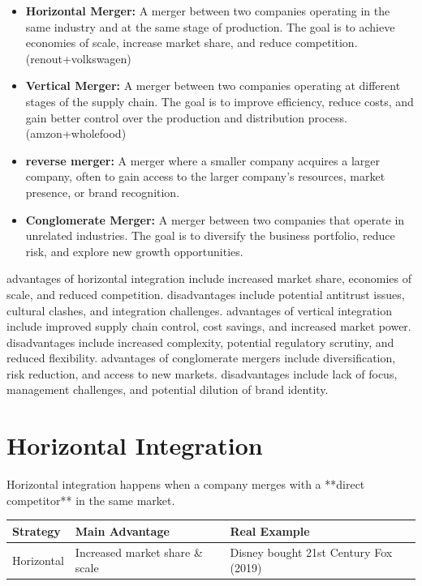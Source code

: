 \documentclass[12pt,a4paper]{report}
\begin{document}
\begin{itemize}
    \item \textbf{Horizontal Merger:} A merger between two companies operating in the same industry and at the same stage of production. The goal is to achieve economies of scale, increase market share, and reduce competition.(renout+volkswagen)
    \item \textbf{Vertical Merger:} A merger between two companies operating at different stages of the supply chain. The goal is to improve efficiency, reduce costs, and gain better control over the production and distribution process.(amzon+wholefood)
    \item \textbf{reverse merger:} A merger where a smaller company acquires a larger company, often to gain access to the larger company's resources, market presence, or brand recognition.
    \item \textbf{Conglomerate Merger:} A merger between two companies that operate in unrelated industries. The goal is to diversify the business portfolio, reduce risk, and explore new growth opportunities.
\end{itemize}
advantages of horizontal integration include increased market share, economies of scale, and reduced competition. disadvantages include potential antitrust issues, cultural clashes, and integration challenges. advantages of vertical integration include improved supply chain control, cost savings, and increased market power. disadvantages include increased complexity, potential regulatory scrutiny, and reduced flexibility. advantages of conglomerate mergers include diversification, risk reduction, and access to new markets. disadvantages include lack of focus, management challenges, and potential dilution of brand identity.
\section{Horizontal Integration}
Horizontal integration happens when a company merges with a **direct competitor** in the same market.

\begin{table}[h]
\centering
\begin{tabular}{lll}
\toprule
\textbf{Strategy} & \textbf{Main Advantage} & \textbf{Real Example} \\
\midrule
Horizontal & Increased market share \& scale & Disney bought 21st Century Fox (2019) \\
\bottomrule
\end{tabular}
\end{table}
\end{document}
